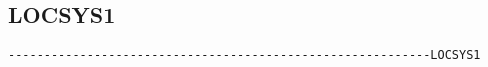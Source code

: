 

\subsection{LOCSYS1}
\begin{verbatim}
-----------------------------------------------------------LOCSYS1
\end{verbatim}

